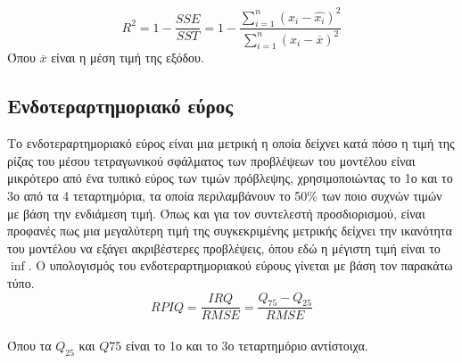 $$R^2=1-\frac{SSE}{SST}=1-\frac{\sum_{i=1}^{n} {\left(x_{i}-\hat{x_{i}}\right)}^2}{\sum_{i=1}^{n} {\left(x_{i}-\overline{x}\right)}^2}$$
Όπου $\overline{x}$ είναι η μέση τιμή της εξόδου.

\subsection{Ενδοτεραρτημοριακό εύρος}
Το ενδοτεραρτημοριακό εύρος είναι μια μετρική η οποία δείχνει κατά πόσο η τιμή της ρίζας του μέσου τετραγωνικού σφάλματος των προβλέψεων του μοντέλου είναι μικρότερο από ένα τυπικό εύρος των τιμών πρόβλεψης, χρησιμοποιώντας το 1ο και το 3ο από τα 4 τεταρτημόρια, τα οποία περιλαμβάνουν το 50\% των ποιο συχνών τιμών με βάση την ενδιάμεση τιμή. Όπως και για τον συντελεστή προσδιορισμού, είναι προφανές πως μια μεγαλύτερη τιμή της συγκεκριμένης μετρικής δείχνει την ικανότητα του μοντέλου να εξάγει ακριβέστερες προβλέψεις, όπου εδώ η μέγιστη τιμή είναι το $\inf$. Ο υπολογισμός του ενδοτεραρτημοριακού εύρους γίνεται με βάση τον παρακάτω τύπο.\\

$$RPIQ=\frac{IRQ}{RMSE}=\frac{Q_{75}-Q_{25}}{RMSE}$$ \\
Όπου τα $Q_{25}$ και $Q{75}$ είναι το 1ο και το 3ο τεταρτημόριο αντίστοιχα.
